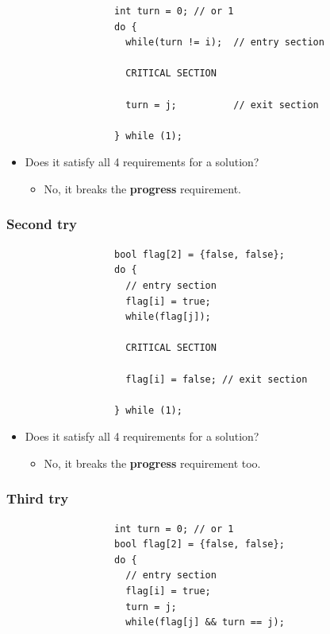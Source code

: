 \documentclass[CJKutf8,xcolor=pdftex,dvipsnames,table]{beamer}
\begin{document}
\begin{CJK*}{UTF8}{song}
\begin{frame}[fragile]
\begin{lstlisting}
                   int turn = 0; // or 1
                   do {
                     while(turn != i);  // entry section

                     CRITICAL SECTION

                     turn = j;          // exit section

                   } while (1);
\end{lstlisting}

  \begin{itemize}
  \item{Does it satisfy all 4 requirements for a solution?} \pause
    \begin{itemize}
    \item{No, it breaks the \textbf{progress} requirement.}
    \end{itemize}
  \end{itemize}
\end{frame}

  \begin{frame}[fragile]
  \frametitle{Second try} \pause

\begin{lstlisting}
                   bool flag[2] = {false, false};
                   do {
                     // entry section
                     flag[i] = true;
                     while(flag[j]);

                     CRITICAL SECTION

                     flag[i] = false; // exit section

                   } while (1);
\end{lstlisting}

  \begin{itemize}
  \item{Does it satisfy all 4 requirements for a solution?} \pause
    \begin{itemize}
    \item{No, it breaks the \textbf{progress} requirement too.}
    \end{itemize}
  \end{itemize}
\end{frame}

  \begin{frame}[fragile]
  \frametitle{Third try} \pause

\begin{lstlisting}
                   int turn = 0; // or 1
                   bool flag[2] = {false, false};
                   do {
                     // entry section
                     flag[i] = true;
                     turn = j;
                     while(flag[j] && turn == j);


\end{lstlisting}
\end{frame}
\end{CJK*}
\end{document}
